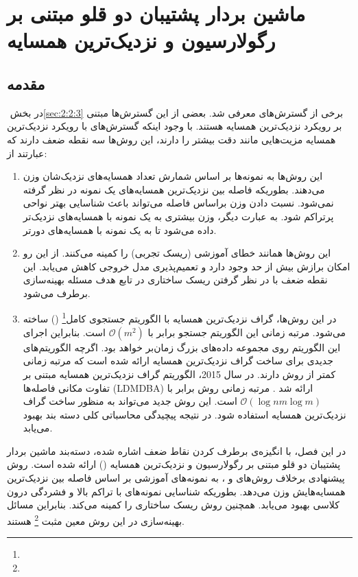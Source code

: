 
\chapter{ماشین بردار پشتیبان دو قلو مبتنی بر رگولارسیون و نزدیک‌ترین همسایه}\label{ch:4}
\section{مقدمه}\label{sec:4:1}
در بخش ‏\ref{sec:2:2:3} برخی از گسترش‌های  معرفی شد. بعضی از این گسترش‌ها مبتنی بر رویکرد نزدیک‌ترین همسایه هستند. با وجود اینکه گسترش‌های با رویکرد نزدیک‌ترین همسایه مزیت‌هایی مانند دقت بیشتر را دارند، این روش‌ها سه نقطه ضعف دارند که عبارتند از:
\begin{enumerate}
	\item این روش‌ها به نمونه‌ها بر اساس شمارش تعداد همسایه‌های نزدیک‌شان وزن می‌دهند. بطوریکه فاصله بین نزدیک‌ترین همسایه‌های یک نمونه در نظر گرفته نمی‌شود. نسبت دادن وزن براساس فاصله می‌تواند باعث شناسایی بهتر نواحی پرتراکم شود. به عبارت دیگر، وزن بیشتری به یک نمونه با همسایه‌های نزدیک‌تر داده می‌شود تا به یک نمونه با همسایه‌های دورتر.
	\item این روش‌ها همانند  خطای آموزشی (ریسک تجربی) را کمینه می‌کنند. از این رو امکان برازش بیش از حد وجود دارد و تعمیم‌پذیری مدل خروجی کاهش می‌یابد. این نقطه ضعف با در نظر گرفتن ریسک ساختاری در تابع هدف مسئله بهینه‌سازی برطرف می‌شود.
	\item در این روش‌ها، گراف نزدیک‌ترین همسایه با الگوریتم جستجوی کامل\footnote{}  () ساخته می‌شود. مرتبه زمانی این الگوریتم جستجو برابر با  $\mathcal{O}(m^2)$ است. بنابراین اجرای این الگوریتم روی مجموعه داده‌های بزرگ زمان‌بر خواهد بود. اگرچه الگوریتم‌های جدیدی برای ساخت گراف نزدیک‌ترین همسایه ارائه شده است که مرتبه زمانی کمتر از روش  دارند. در سال 2015، الگوریتم گراف نزدیک‌ترین همسایه مبتنی بر تفاوت مکانی فاصله‌ها (\gls*{LDMDBA}) ارائه شد \cite{xia2015}. مرتبه زمانی روش  برابر با $\mathcal{O}(\log nm\log m)$ است. این روش جدید می‌تواند به منظور ساخت گراف نزدیک‌ترین همسایه استفاده شود. در نتیجه پیچیدگی محاسباتی کلی دسته بند بهبود می‌یابد.
\end{enumerate} 

در این فصل، با انگیزه‌ی برطرف کردن نقاط ضعف اشاره شده، دسته‌بند ماشین بردار پشتیبان دو قلو مبتنی بر رگولارسیون و نزدیک‌ترین همسایه  () ارائه شده است. روش پیشنهادی برخلاف روش‌های  و ، به نمونه‌های آموزشی بر اساس فاصله بین نزدیک‌ترین همسایه‌هایش وزن می‌دهد. بطوریکه شناسایی نمونه‌های با تراکم بالا و فشردگی درون کلاسی بهبود می‌یابد. همچنین روش  ریسک ساختاری را کمینه می‌کند. بنابراین مسائل بهینه‌سازی در این روش معین مثبت \footnote{} هستند.

